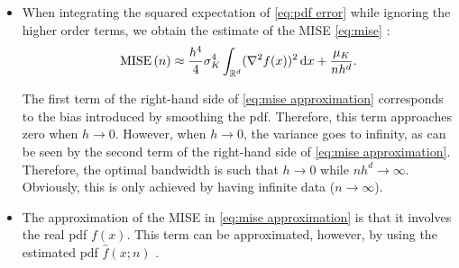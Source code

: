 \documentclass[10pt,final,a4paper,oneside,onecolumn]{article}
\newlength{\figurewidth}
\newlength{\figureheight}
\newcommand{\mise}[1]{\textup{MISE} \left( #1 \right)}
\begin{document}
\begin{itemize}
\begin{itemize}
%		
%			

		\item When integrating the squared expectation of \cref{eq:pdf error} while ignoring the higher order terms, we obtain the estimate of the MISE \cref{eq:mise} \cite{chen2017tutorial}:
		\begin{equation} \label{eq:mise approximation}
		\mise{n} \approx \frac{h^4}{4} \sigma_K^4 \int_{\mathbb{R}^d} (\nabla^2 f(x))^2 \, \textup{d}x + \frac{\mu_K}{nh^d}.
		\end{equation}
		
		The first term of the right-hand side of \cref{eq:mise approximation} corresponds to the bias introduced by smoothing the pdf. Therefore, this term approaches zero when $h \rightarrow 0$. However, when $h \rightarrow 0$, the variance goes to infinity, as can be seen by the second term of the right-hand side of \cref{eq:mise approximation}. Therefore, the optimal bandwidth is such that $h \rightarrow 0$ while $nh^d \rightarrow \infty$. Obviously, this is only achieved by having infinite data ($n \rightarrow \infty$).
		
		\item The approximation of the MISE in \cref{eq:mise approximation} is that it involves the real pdf $f(x)$. This term can be approximated, however, by using the estimated pdf $\hat{f}(x;n)$ \cite{calonico2018effect}. 
		

\end{itemize}
\end{itemize}
\end{document}
